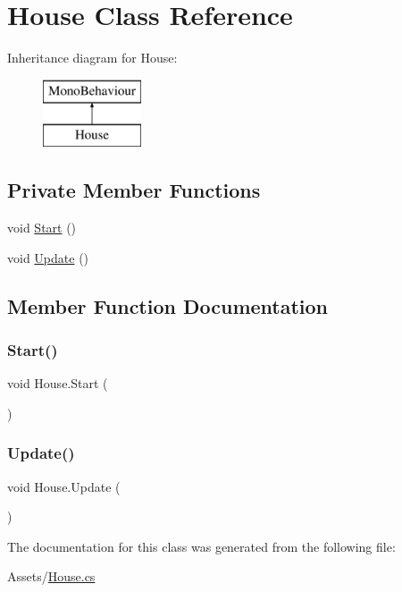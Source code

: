 \hypertarget{class_house}{}\section{House Class Reference}
\label{class_house}
Inheritance diagram for House\+:\begin{figure}[H]
\begin{center}
\leavevmode
\includegraphics[height=2.000000cm]{class_house}
\end{center}
\end{figure}
\subsection*{Private Member Functions}
\begin{DoxyCompactItemize}
\item 
void \hyperlink{class_house_a15ab6066a77137144da99a8d721fe4e8}{Start} ()
\item 
void \hyperlink{class_house_a685c74a84fbe4dce8482be9cff0a43b8}{Update} ()
\end{DoxyCompactItemize}


\subsection{Member Function Documentation}
\mbox{\label{class_house_a15ab6066a77137144da99a8d721fe4e8}} 
\subsubsection{\texorpdfstring{Start()}{Start()}}
{\footnotesize\ttfamily void House.\+Start (\begin{DoxyParamCaption}{ }\end{DoxyParamCaption})\hspace{0.3cm}{\ttfamily [private]}}

\mbox{\label{class_house_a685c74a84fbe4dce8482be9cff0a43b8}} 
\subsubsection{\texorpdfstring{Update()}{Update()}}
{\footnotesize\ttfamily void House.\+Update (\begin{DoxyParamCaption}{ }\end{DoxyParamCaption})\hspace{0.3cm}{\ttfamily [private]}}



The documentation for this class was generated from the following file\+:\begin{DoxyCompactItemize}
\item 
Assets/\hyperlink{_house_8cs}{House.\+cs}\end{DoxyCompactItemize}
